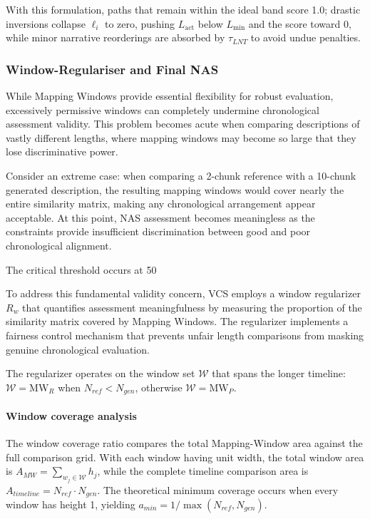 \documentclass[main.tex]{subfiles}
\begin{document}
With this formulation, paths that remain within the ideal band score 1.0; drastic inversions collapse $\ell_i$ to zero, pushing $L_{\text{act}}$ below $L_{\min}$ and the score toward 0, while minor narrative reorderings are absorbed by $\tau_{LNT}$ to avoid undue penalties.

\subsubsection{Window-Regulariser and Final NAS}
While Mapping Windows provide essential flexibility for robust evaluation, excessively permissive windows can completely undermine chronological assessment validity. This problem becomes acute when comparing descriptions of vastly different lengths, where mapping windows may become so large that they lose discriminative power.

Consider an extreme case: when comparing a 2-chunk reference with a 10-chunk generated description, the resulting mapping windows would cover nearly the entire similarity matrix, making any chronological arrangement appear acceptable. At this point, NAS assessment becomes meaningless as the constraints provide insufficient discrimination between good and poor chronological alignment.

The critical threshold occurs at 50%

To address this fundamental validity concern, VCS employs a window regularizer $R_w$ that quantifies assessment meaningfulness by measuring the proportion of the similarity matrix covered by Mapping Windows. The regularizer implements a fairness control mechanism that prevents unfair length comparisons from masking genuine chronological evaluation.

The regularizer operates on the window set $\mathcal{W}$ that spans the longer timeline: $\mathcal{W} = \text{MW}_{R}$ when $N_{ref} < N_{gen}$, otherwise $\mathcal{W} = \text{MW}_{P}$.

\paragraph{Window coverage analysis}
The window coverage ratio compares the total Mapping-Window area against the full comparison grid. With each window having unit width, the total window area is $A_{MW} = \sum_{w_j \in \mathcal{W}} h_j$, while the complete timeline comparison area is $A_{timeline} = N_{ref} \cdot N_{gen}$. The theoretical minimum coverage occurs when every window has height 1, yielding $a_{min} = 1/\max(N_{ref}, N_{gen})$.
\end{document}
